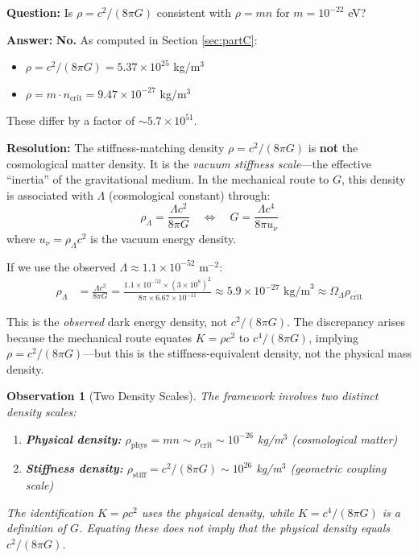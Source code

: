 \documentclass[11pt,a4paper]{article}
\newcommand{\ee}[1]{\times 10^{#1}}
\newcommand{\rhocrit}{\ensuremath{\rho_{\mathrm{crit}}}}
\newtheorem{observation}{Observation}
\begin{document}
\textbf{Question:} Is $\rho = c^2/(8\pi G)$ consistent with $\rho = mn$ for $m = 10^{-22}$ eV?

\textbf{Answer:} \textbf{No.} As computed in Section \ref{sec:partC}:
\begin{itemize}
    \item $\rho = c^2/(8\pi G) = 5.37 \ee{25}$ kg/m$^3$
    \item $\rho = m \cdot n_{\mathrm{crit}} = 9.47 \ee{-27}$ kg/m$^3$
\end{itemize}

These differ by a factor of $\sim 5.7 \ee{51}$.

\textbf{Resolution:} The stiffness-matching density $\rho = c^2/(8\pi G)$ is \textbf{not} the cosmological matter density. It is the \emph{vacuum stiffness scale}---the effective ``inertia'' of the gravitational medium. In the mechanical route to $G$, this density is associated with $\Lambda$ (cosmological constant) through:
\begin{equation}
\rho_\Lambda = \frac{\Lambda c^2}{8\pi G} \quad \Leftrightarrow \quad G = \frac{\Lambda c^4}{8\pi u_\nu}
\end{equation}
where $u_\nu = \rho_\Lambda c^2$ is the vacuum energy density.

If we use the observed $\Lambda \approx 1.1 \ee{-52}$ m$^{-2}$:
\begin{align}
\rho_\Lambda &= \frac{\Lambda c^2}{8\pi G} = \frac{1.1 \ee{-52} \times (3 \ee{8})^2}{8\pi \times 6.67 \ee{-11}} \approx 5.9 \ee{-27} \text{ kg/m}^3 \approx \Omega_\Lambda \rhocrit
\end{align}

This is the \emph{observed} dark energy density, not $c^2/(8\pi G)$. The discrepancy arises because the mechanical route equates $K = \rho c^2$ to $c^4/(8\pi G)$, implying $\rho = c^2/(8\pi G)$---but this is the stiffness-equivalent density, not the physical mass density.

\begin{observation}[Two Density Scales]
The framework involves two distinct density scales:
\begin{enumerate}
    \item \textbf{Physical density:} $\rho_{\mathrm{phys}} = mn \sim \rhocrit \sim 10^{-26}$ kg/m$^3$ (cosmological matter)
    \item \textbf{Stiffness density:} $\rho_{\mathrm{stiff}} = c^2/(8\pi G) \sim 10^{26}$ kg/m$^3$ (geometric coupling scale)
\end{enumerate}
The identification $K = \rho c^2$ uses the \emph{physical} density, while $K = c^4/(8\pi G)$ is a definition of $G$. Equating these does \emph{not} imply that the physical density equals $c^2/(8\pi G)$.
\end{observation}
\end{document}
